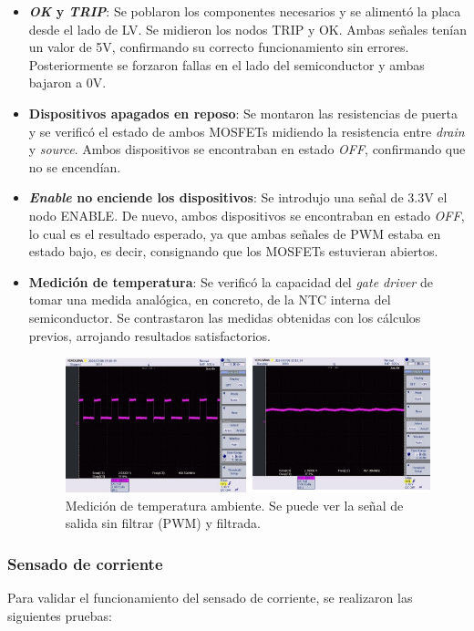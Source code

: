 \begin{itemize}
	\item \textbf{\textit{OK} y \textit{TRIP}}: Se poblaron los componentes necesarios y se alimentó la placa desde el lado de LV. Se midieron los nodos TRIP y OK. Ambas señales tenían un valor de 5V, confirmando su correcto funcionamiento sin errores. Posteriormente se forzaron fallas en el lado del semiconductor y ambas bajaron a 0V.
	\item \textbf{Dispositivos apagados en reposo}: Se montaron las resistencias de puerta y se verificó el estado de ambos MOSFETs midiendo la resistencia entre \textit{drain} y \textit{source}. Ambos dispositivos se encontraban en estado \textit{OFF}, confirmando que no se encendían.
	\item \textbf{\textit{Enable} no enciende los dispositivos}: Se introdujo una señal de 3.3V el nodo ENABLE. De nuevo, ambos dispositivos se encontraban en estado \textit{OFF}, lo cual es el resultado esperado, ya que ambas señales de PWM estaba en estado bajo, es decir, consignando que los MOSFETs estuvieran abiertos.
	\item \textbf{Medición de temperatura}: Se verificó la capacidad del \textit{gate driver} de tomar una medida analógica, en concreto, de la NTC interna del semiconductor. Se contrastaron las medidas obtenidas con los cálculos previos, arrojando resultados satisfactorios.
	
	\begin{figure}[H]
		\centering
		\includegraphics[width=0.7\linewidth]{fig/NTC-driver}
		\caption{Medición de temperatura ambiente. Se puede ver la señal de salida sin filtrar (PWM) y filtrada.}
	\end{figure}
	
\end{itemize}
	
\subsubsection{Sensado de corriente}

Para validar el funcionamiento del sensado de corriente, se realizaron las siguientes pruebas:

